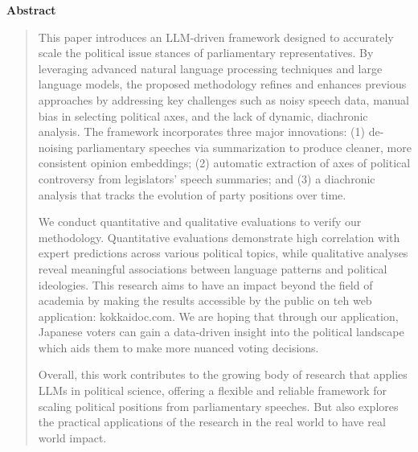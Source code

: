 \documentclass[final,5p,times,twocolumn,authoryear]{elsarticle}
\begin{document}
\clearpage
\onecolumn
{}

\begin{center}
  {\Large \textbf{Abstract}}
\end{center}
\vspace{1em}
\begin{quote}

	This paper introduces an LLM-driven framework designed to accurately scale the political issue stances of parliamentary representatives. By leveraging advanced natural language processing techniques and large language models, the proposed methodology refines and enhances previous approaches by addressing key challenges such as noisy speech data, manual bias in selecting political axes, and the lack of dynamic, diachronic analysis. The framework incorporates three major innovations: (1) de-noising parliamentary speeches via summarization to produce cleaner, more consistent opinion embeddings; (2) automatic extraction of axes of political controversy from legislators’ speech summaries; and (3) a diachronic analysis that tracks the evolution of party positions over time.
	
	We conduct quantitative and qualitative evaluations to verify our methodology. Quantitative evaluations demonstrate high correlation with expert predictions across various political topics, while qualitative analyses reveal meaningful associations between language patterns and political ideologies. This research aims to have an impact beyond the field of academia by making the results accessible by the public on teh web application: kokkaidoc.com. We are hoping that through our application, Japanese voters can gain a data-driven insight into the political landscape which aids them to make more nuanced voting decisions. 
	
	Overall, this work contributes to the growing body of research that applies LLMs in political science, offering a flexible and reliable framework for scaling political positions from parliamentary speeches. But also explores the practical applications of the research in the real world to have real world impact. 

\end{quote}

\clearpage
\end{document}
